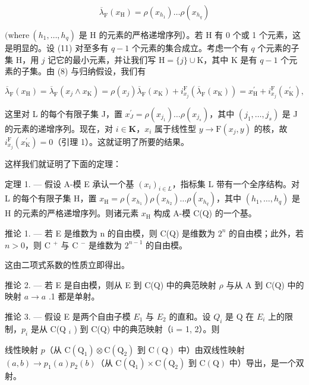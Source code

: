 \[
\overline {{{{\lambda}}}} _ {\mathrm{F}} (x _ {\mathrm{H}}) = \rho (x _ {h _ {1}}) \dots \rho (x _ {h _ {q}})\tag{11}
\]

\((\mathrm{where}\ (h_{1},\ldots,h_{q})\) 是 H 的元素的严格递增序列）。若 H 有 0 个或 1 个元素，这是明显的。设 (11) 对至多有 \(q-1\) 个元素的集合成立。考虑一个有 \(q\) 个元素的子集 H，用 \(j\) 记它的最小元素，并让我们写 \(\mathrm{H}=\{j\}\cup\mathrm{K}\)，其中 K 是有 \(q-1\) 个元素的子集。由 (8) 与归纳假设，我们有

\[
\overline {{{\lambda}}} _ {\mathrm{F}} (x _ {\mathrm{H}}) = \overline {{{\lambda}}} _ {\mathrm{F}} (x _ {j} \wedge x _ {\mathrm{K}}) = \rho (x _ {j}) \overline {{{\lambda}}} _ {\mathrm{F}} (x _ {\mathrm{K}}) + i _ {x _ {j}} ^ {\mathrm{F}} (\overline {{{\lambda}}} _ {\mathrm{F}} (x _ {\mathrm{K}})) = x _ {\mathrm{H}} ^ {\prime} + i _ {x _ {j}} ^ {\mathrm{F}} (x _ {\mathrm{K}} ^ {\prime}),
\]

这里对 L 的每个有限子集 J，置 \(x_{J}^{\prime}=\rho(x_{j_{1}})\ldots\rho(x_{j_{s}})\)，其中 \((j_{1},\ldots,j_{s})\) 是 J 的元素的递增序列。现在，对 \(i\in\mathbf{K}\)，\(x_{i}\) 属于线性型 \(y\to\mathrm{F}(x_{j},y)\) 的核，故 \(i_{x_{j}}^{\mathrm{F}}(x_{\mathrm{K}}^{\prime})=0\)（引理 1）。这就证明了所要的结果。

  这样我们就证明了下面的定理：

定理 1. --- 假设 A-模 E 承认一个基 \((x_{i})_{i\in L}\)，指标集 L 带有一个全序结构。对 L 的每个有限子集 H，置 \(x_{\mathrm{H}} = \rho(x_{h_1})\rho(x_{h_2})\ldots \rho(x_{h_q})\)，其中 \((h_1,\ldots,h_q)\) 是 H 的元素的严格递增序列。则诸元素 \(x_{\mathrm{H}}\) 构成 A-模 C(Q) 的一个基。

推论 1. --- 若 E 是维数为 n 的自由模，则 C(Q) 是维数为 \(2^{n}\) 的自由模；此外，若 \(n > 0\)，则 C \(^{+}\) 与 C \(^{-}\) 是维数为 \(2^{n-1}\) 的自由模。

  这由二项式系数的性质立即得出。

推论 2. --- 若 E 是自由模，则从 E 到 C(Q) 中的典范映射 \(\rho\) 与从 A 到 C(Q) 中的映射 \(a \to a\) .1 都是单射。

推论 3. --- 假设 E 是两个自由子模 \(E_{1}\) 与 \(E_{2}\) 的直和。设 \(Q_{i}\) 是 Q 在 \(E_{i}\) 上的限制，\(p_{i}\) 是从 C(Q \(_{i}\) ) 到 C(Q) 中的典范映射（i = 1, 2）。则

线性映射 \(p\)（从 \(\mathrm{C(Q_{1})\otimes C(Q_{2})}\) 到 \(\mathrm{C(Q)}\) 中）由双线性映射 \((a,b)\to p_{1}(a)p_{2}(b)\)（从 \(\mathrm{C(Q_{1})\times C(Q_{2})}\) 到 \(\mathrm{C(Q)}\) 中）导出，是一个双射。


